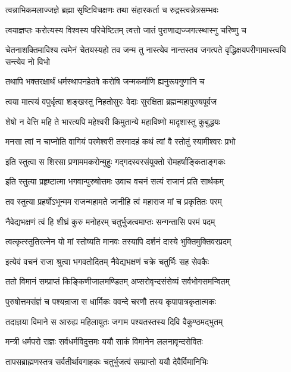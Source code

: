 \twolineshloka
{त्वन्नाभिकमलाज्जज्ञे ब्रह्मा सृष्टिविचक्षणः}
{तथा संहारकर्ता च रुद्रस्त्वन्नेत्रसम्भवः}%

\twolineshloka
{त्वयाज्ञप्तः करोत्यस्य विश्वस्य परिचेष्टितम्}
{त्वत्तो जातं पुराणाद्यज्जगत्स्थास्नु चरिष्णु च}%


\threelineshloka
{चेतनाशक्तिमाविश्य त्वमेनं चेतयस्यहो}
{तव जन्म तु नास्त्येव नान्तस्तव जगत्पते}
{वृद्धिक्षयपरीणामास्त्वयि सन्त्येव नो विभो}%

\twolineshloka
{तथापि भक्तरक्षार्थं धर्मस्थापनहेतवे}
{करोषि जन्मकर्माणि ह्यनुरूपगुणानि च}%

\twolineshloka
{त्वया मात्स्यं वपुर्धृत्वा शङ्खस्तु निहतोसुरः}
{वेदाः सुरक्षिता ब्रह्मन्महापुरुषपूर्वज}%

\twolineshloka
{शेषो न वेत्ति महि ते भारत्यपि महेश्वरी}
{किमुतान्ये महाविष्णो मादृशास्तु कुबुद्धयः}%

\twolineshloka
{मनसा त्वां न चाप्नोति वागियं परमेश्वरी}
{तस्मादहं कथं त्वां वै स्तोतुं स्यामीश्वरः प्रभो}%

\twolineshloka
{इति स्तुत्वा स शिरसा प्रणाममकरोन्मुहुः}
{गद्गदस्वरसंयुक्तो रोमहर्षाङ्किताङ्गकः}%

\twolineshloka
{इति स्तुत्या प्रहृष्टात्मा भगवान्पुरुषोत्तमः}
{उवाच वचनं सत्यं राजानं प्रति सार्थकम्}%


\twolineshloka
{तव स्तुत्या प्रहर्षोऽभून्मम राजन्महामते}
{जानीहि त्वं महाराज मां च प्रकृतितः परम्}%

\twolineshloka
{नैवेद्यभक्षणं त्वं हि शीघ्रं कुरु मनोहरम्}
{चतुर्भुजत्वमाप्तः सन्गन्तासि परमं पदम्}%

\twolineshloka
{त्वत्कृत्स्तुतिरत्नेन यो मां स्तोष्यति मानवः}
{तस्यापि दर्शनं दास्ये भुक्तिमुक्तिवरप्रदम्}%

\twolineshloka
{इत्येवं वचनं राजा श्रुत्वा भगवतोदितम्}
{नैवेद्यभक्षणं चक्रे चतुर्भिः सह सेवकैः}%

\twolineshloka
{ततो विमानं सम्प्राप्तं किङ्किणीजालमण्डितम्}
{अप्सरोवृन्दसंसेव्यं सर्वभोगसमन्वितम्}%

\twolineshloka
{पुरुषोत्तमसंज्ञं च पश्यन्राजा स धार्मिकः}
{ववन्दे चरणौ तस्य कृपापात्रकृतात्मकः}%

\twolineshloka
{तदाज्ञया विमाने स आरुह्य महिलायुतः}
{जगाम पश्यतस्तस्य दिवि वैकुण्ठमद्भुतम्}%

\twolineshloka
{मन्त्री धर्मपरो राज्ञः सर्वधर्मविदुत्तमः}
{ययौ साकं विमानेन ललनावृन्दसेवितः}%

\twolineshloka
{तापसब्राह्मणस्तत्र सर्वतीर्थावगाहकः}
{चतुर्भुजत्वं सम्प्राप्तो ययौ देवैर्विमानिभिः}%

